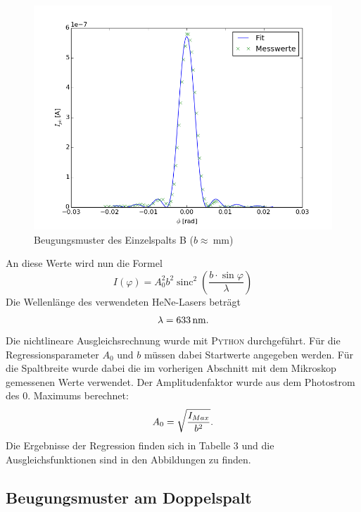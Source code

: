 \documentclass[11pt,ngerman,a4paper]{article}
\begin{document}
\begin{figure}[H]
\centering
\includegraphics[scale=0.8]{plot1.png}
\caption{Beugungsmuster des Einzelspalts B ($b \approx \SI{}{\milli\meter}$)}
\label{plot1}
\end{figure}

\noindent
An diese Werte wird nun die Formel 
\begin{equation}
I(\varphi) = A_0^2b^2\operatorname{sinc}^2\left( \frac{b\cdot\sin{\varphi}}{\lambda}\right)
\end{equation}
Die Wellenlänge des verwendeten HeNe-Lasers beträgt
\[
\lambda = \SI{633}{\nano\meter}\rm.
\] 
Die nichtlineare Ausgleichsrechnung wurde mit \textsc{Python} durchgeführt. Für die Regressionsparameter $A_0$ und $b$ müssen dabei Startwerte angegeben werden. Für die Spaltbreite wurde dabei die im vorherigen Abschnitt mit dem Mikroskop gemessenen Werte verwendet. Der Amplitudenfaktor wurde aus dem Photostrom des 0. Maximums berechnet:
\[
A_0= \sqrt{\frac{I_{Max}}{b^2}}\rm.
\] 
Die Ergebnisse der Regression finden sich in Tabelle 3 und die Ausgleichsfunktionen sind in den Abbildungen zu finden.
\subsection{Beugungsmuster am Doppelspalt}
\end{document}
